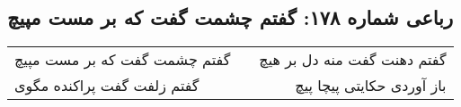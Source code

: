 \begin{center}
\section*{رباعی شماره ۱۷۸: گفتم چشمت گفت که بر مست مپیچ}
\label{sec:sh178}
\begin{longtable}{l p{0.5cm} r}
گفتم چشمت گفت که بر مست مپیچ
&&
گفتم دهنت گفت منه دل بر هیچ
\\
گفتم زلفت گفت پراکنده مگوی
&&
باز آوردی حکایتی پیچا پیچ
\\
\end{longtable}
\end{center}
